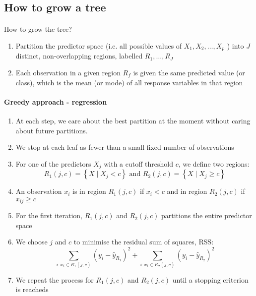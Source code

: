 \documentclass[12pt,a4paper]{article}
\begin{document}
    \subsection{How to grow a tree}
    \paragraph{}
    How to grow the tree?
    \begin{enumerate}
        \item Partition the predictor space (i.e. all possible values of $X_1, X_2, \ldots, X_p$ ) into $J$ distinct, non-overlapping regions, labelled $R_1, \ldots, R_J$
        \item  Each observation in a given region $R_f$ is given the same predicted value (or class), which is the mean (or mode) of all response variables in that region
    \end{enumerate}
    \paragraph*{Greedy approach - regression}
    \begin{enumerate}
        \item At each step, we care about the best partition at the moment without caring about future partitions.
        \item We stop at each leaf as fewer than a small fixed number of observations
        \item For one of the predictors $X_j$ with a cutoff threshold $c$, we define two regions:
            $$
            R_1(j, c)=\left\{X \mid X_j<c\right\} \text { and } R_2(j, c)=\left\{X \mid X_j \geq c\right\}
            $$
        \item An observation $x_i$ is in region $R_1(j, c)$ if $x_i<c$ and in region $R_2(j, c)$ if $x_{i j} \geq c$
        \item For the first iteration, $R_1(j, c)$ and $R_2(j, c)$ partitions the entire predictor space
        \item We choose $j$ and $c$ to minimise the residual sum of squares, RSS:
            $$
            \sum_{i: x_{i} \in R_{1}(j, c)}\left(y_{i}-\hat{y}_{R_{1}}\right)^{2}+\sum_{i: x_{i} \in R_{2}(j, c)}\left(y_{i}-\hat{y}_{R_{2}}\right)^{2}
            $$
        \item We repeat the process for $R_1(j, c)$ and $R_2(j, c)$ until a stopping criterion is reacheds
    \end{enumerate}
\end{document}
